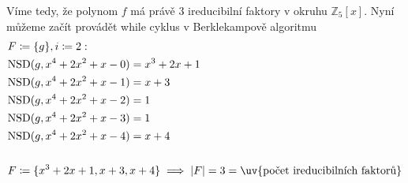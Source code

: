\documentclass[12pt, a4paper]{article}
\begin{document}
Víme tedy, že polynom $f$ má právě 3 ireducibilní faktory v okruhu $\mathbb{Z}_5[x]$. Nyní můžeme začít provádět while cyklus v Berklekampově algoritmu
\begin{align*}
& F \coloneqq \{g\}, i \coloneqq 2: \\
& \text{NSD}(g, x^4+2x^2+x-0) = x^3+2x+1\\
& \text{NSD}(g, x^4+2x^2+x-1) = x+3\\
& \text{NSD}(g, x^4+2x^2+x-2) = 1\\
& \text{NSD}(g, x^4+2x^2+x-3) = 1\\
& \text{NSD}(g, x^4+2x^2+x-4) = x+4\\\\
& F \coloneqq \{x^3+2x+1, x+3, x+4\} \implies |F|=3=\text{\uv{počet ireducibilních faktorů}}
\end{align*}
\end{document}
